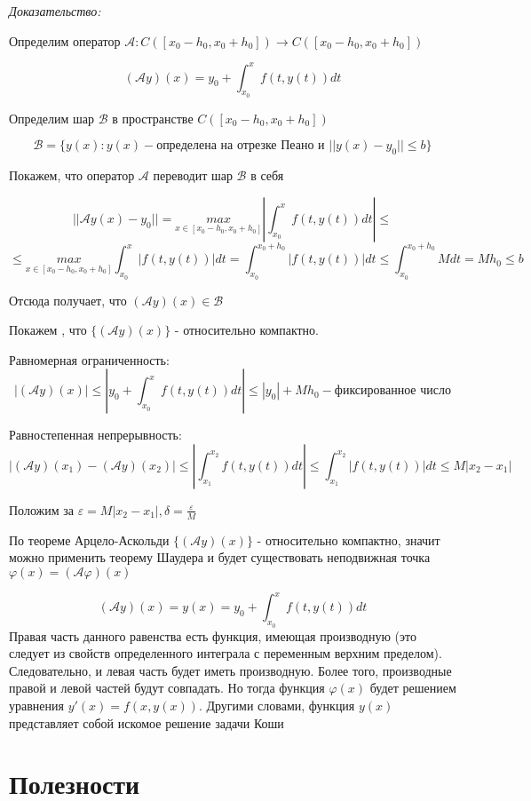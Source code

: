 \documentclass[12pt]{article}
\begin{document}
\textit{Доказательство:}

	Определим оператор $\mathcal{A}: C([x_0 - h_0, x_0 + h_0]) \to  C([x_0 - h_0, x_0 + h_0])$ 
	
	$$(\mathcal{A}y)(x) = y_0 + \int_{x_0}^x f(t,y(t))dt$$
	
	Определим шар $\mathcal{B}$ в пространстве $C([x_0 - h_0, x_0 + h_0])$
	
	 $$\mathcal{B} = \{ y(x) : y(x) - \text{определена на отрезке Пеано и } ||y(x) - y_0|| \le b \}$$

	Покажем, что оператор $\mathcal{A}$ переводит шар $\mathcal{B}$ в себя
	
	$$||\mathcal{A}y(x) - y_0|| =  \underset{x \in [x_0 - h_0, x_0 + h_0]} {max} |\int_{x_0}^x f(t,y(t))dt| \le$$
	$$\le \underset{x \in [x_0 - h_0, x_0 + h_0]} {max} \int_{x_0}^x |f(t,y(t))|dt = \int_{x_0}^{x_0 + h_0} |f(t,y(t))|dt \le \int_{x_0}^{x_0 + h_0} Mdt = Mh_0 \le b $$
	
	
	Отсюда получает, что $(\mathcal{A}y)(x) \in \mathcal{B}$
	
	Покажем , что $\{ (\mathcal{A}y)(x) \}$ - относительно компактно.
	
	Равномерная ограниченность:
	$$|(\mathcal{A}y)(x)| \le |y_0 + \int_{x_0}^x f(t,y(t))dt| \le |y_0| + Mh_0 - \text{фиксированное число}$$
	
	Равностепенная непрерывность:
	$$|(\mathcal{A}y)(x_1) - (\mathcal{A}y)(x_2)| \le |\int_{x_1}^{x_2} f(t,y(t))dt| \le \int_{x_1}^{x_2} |f(t,y(t))|dt \le M|x_2 - x_1|$$
	
	Положим за $\varepsilon = M|x_2 - x_1|, \delta = \frac{\varepsilon}{M}$
	
	По теореме Арцело-Аскольди $\{ (\mathcal{A}y)(x) \}$ - относительно компактно, значит можно применить теорему Шаудера и будет существовать неподвижная точка $\varphi(x) = (\mathcal{A}\varphi)(x)$
	
	
	$$(\mathcal{A}y)(x) = y(x) = y_0 + \int_{x_0}^x f(t,y(t))dt$$
	Правая часть данного равенства есть функция, имеющая производную (это
следует из свойств определенного интеграла с переменным верхним пределом). Следовательно, и левая часть будет иметь производную. Более того, производные правой и левой частей будут совпадать. Но тогда функция $\varphi(x)$ будет решением уравнения 
$y'(x) = f(x, y(x))$. Другими словами, функция $y(x)$ представляет собой искомое решение задачи Коши
	
\newpage
\part{Полезности}
\end{document}
